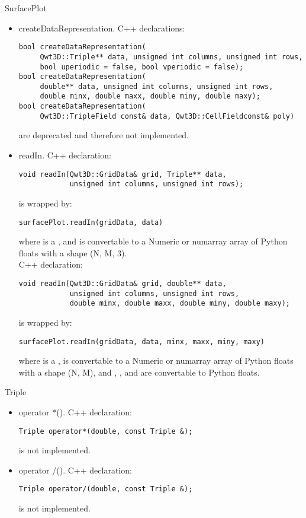 \documentclass{manual}
\begin{document}
\begin{classdesc*}{SurfacePlot}
\begin{itemize}
  \item{createDataRepresentation}. C++ declarations:
\begin{verbatim}
bool createDataRepresentation(
     Qwt3D::Triple** data, unsigned int columns, unsigned int rows,
     bool uperiodic = false, bool vperiodic = false);
bool createDataRepresentation(
     double** data, unsigned int columns, unsigned int rows,
     double minx, double maxx, double miny, double maxy);
bool createDataRepresentation(
     Qwt3D::TripleField const& data, Qwt3D::CellFieldconst& poly)
\end{verbatim}
    are deprecated and therefore not implemented.
  \item{readIn}. C++ declaration:
\begin{verbatim}
void readIn(Qwt3D::GridData& grid, Triple** data,
            unsigned int columns, unsigned int rows);
\end{verbatim}
    is wrapped by:
\begin{verbatim}
surfacePlot.readIn(gridData, data) 
\end{verbatim}
    where  is a , and  is convertable
    to a Numeric or numarray array of Python floats with a shape (N, M, 3).\\
    C++ declaration:
\begin{verbatim}
void readIn(Qwt3D::GridData& grid, double** data,
            unsigned int columns, unsigned int rows,
            double minx, double maxx, double miny, double maxy);
\end{verbatim}
    is wrapped by:
\begin{verbatim}
surfacePlot.readIn(gridData, data, minx, maxx, miny, maxy)
\end{verbatim}
    where  is a ,  is convertable to
    a Numeric or numarray array of Python floats with a shape (N, M), and
    , ,  and  are convertable to Python
    floats.
  \end{itemize}
\end{classdesc*}

\begin{classdesc*}{Triple}
  \begin{itemize}
  \item{operator *()}. C++ declaration:
\begin{verbatim}
Triple operator*(double, const Triple &);
\end{verbatim}
    is not implemented.
  \item{operator /()}. C++ declaration:
\begin{verbatim}
Triple operator/(double, const Triple &);
\end{verbatim}
    is not implemented.
  \end{itemize}
\end{classdesc*}
\end{document}

